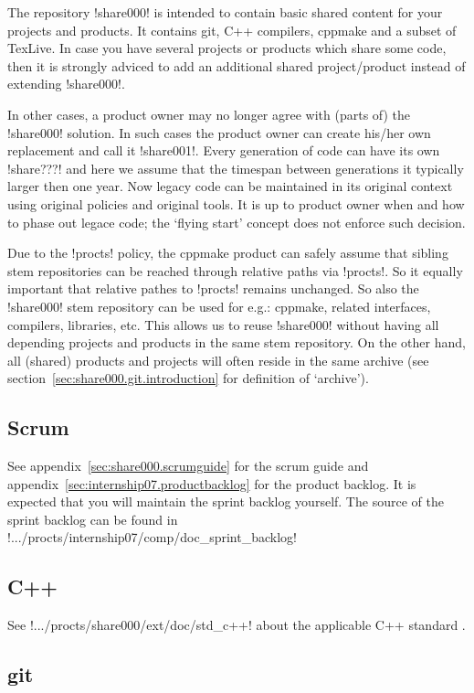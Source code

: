 The repository !share000! is intended to contain basic shared content for your
projects and products. It contains git, C++ compilers, cppmake and a subset of TexLive.
In case you have several projects or products which share some code, then it is
strongly adviced to add an additional shared project/product instead of
extending !share000!.

In other cases, a product owner may no longer agree with (parts of) the !share000! 
solution. In such cases the product owner can create his/her own 
replacement and call it !share001!. Every generation of code can have its own
!share???! and here we assume that the timespan between generations it typically 
larger then one year. Now legacy code can be maintained in its original context 
using original policies and original tools. It is up to product owner when and how
to phase out legace code; the `flying start' concept does not enforce such decision.

Due to the !procts! policy, the cppmake product can safely assume that sibling stem
repositories can be reached through relative paths via !procts!. So it equally important
that relative pathes to !procts! remains unchanged. So also the !share000! stem
repository can be used for e.g.: cppmake, related interfaces, compilers, libraries,
etc. This allows us to reuse !share000! without having all depending projects and 
products in the same stem repository. On the other hand, all (shared) products and
projects will often reside in the same archive 
(see section~\ref{sec:share000.git.introduction} for definition of `archive').

\subsection{Scrum}

See appendix~\ref{sec:share000.scrumguide} for the scrum guide and 
appendix~\ref{sec:internship07.productbacklog} for the product backlog.
It is expected that you will maintain the sprint backlog yourself. The
source of the sprint backlog can be found in 
!.../procts/internship07/comp/doc_sprint_backlog!

\subsection{C++}

See !.../procts/share000/ext/doc/std_c++! about the applicable C++ standard \cite{CPP}.

\subsection{git}

